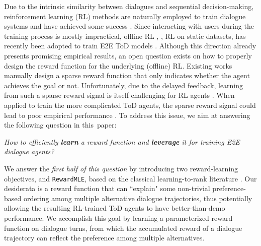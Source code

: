 Due to the intrinsic similarity between dialogues and sequential decision-making, reinforcement learning (RL) methods are naturally employed to train dialogue systems and have achieved some success \citep[\eg,][]{williams2007partially,georgila2011reinforcement,zhao2019rethinking}.
Since interacting with users during the training process is mostly impractical, offline RL \citep{batchrl2012,offlinetutorial2020}, \ie, RL on static datasets, has recently been adopted to train E2E ToD models \citep[\eg,][]{offlinerldialog2019,jaques2020human,caspi2021,snell2022offline,snell2022context,gptcritic2022}.
Although this direction already presents promising empirical results, an open question exists on how to properly design the reward function for the underlying (offline) RL.
Existing works \citep[\eg,][]{wu2019switch,gptcritic2022,snell2022context} manually design a sparse reward function that only indicates whether the agent achieves the goal or not.
Unfortunately, due to the delayed feedback, learning from such a sparse reward signal is itself challenging for RL agents \citep{andrychowicz2017hindsight,liu2018competitive,aim2021}. 
When applied to train the more complicated ToD agents, the sparse reward signal could lead to poor empirical performance \citep{takanobu2019guided,wang2020learning}. 
To address this issue, we aim at answering the following question in this~paper:
\begin{center}
    \vspace{-.28em}
    \textit{How to efficiently \textbf{learn} a reward function and \textbf{leverage} it for training E2E dialogue agents?}
    \vspace{-.28em}
\end{center}
We answer the \textit{first half of this question} by introducing two reward-learning objectives, \rewardnet and \texttt{RewardMLE}, based on the classical learning-to-rank literature \citep{listnet2007,listmle2008}. 
Our desiderata is a reward function that can ``explain" some non-trivial preference-based ordering among multiple alternative dialogue trajectories, thus potentially allowing the resulting RL-trained ToD agents to have better-than-demo performance.
We accomplish this goal by learning a parameterized reward function on dialogue turns, from which the accumulated reward of a dialogue trajectory can reflect the preference among multiple alternatives. 
